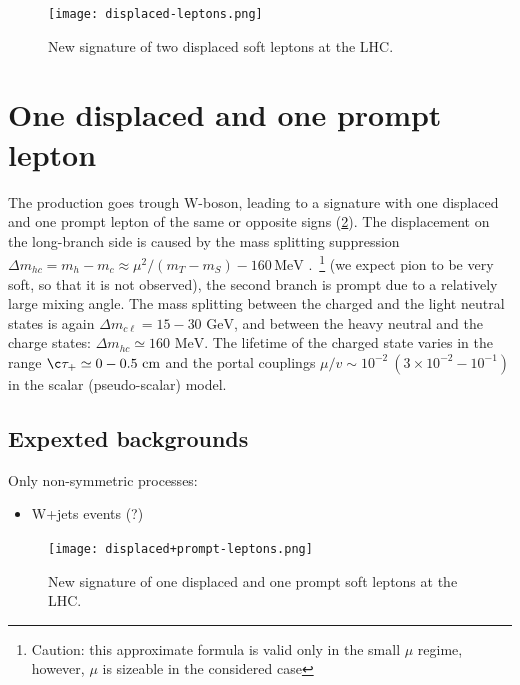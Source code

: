 \documentclass[12pt,letterpaper,notitlepage]{article}
\begin{document}
\begin{figure}[!h]
\centering
\texttt{[image: displaced-leptons.png]}
\caption{\label{fig:2displaced_diagram}New signature of two displaced soft leptons at the LHC.}
\end{figure}

\section{One displaced and one prompt lepton}

The production goes trough W-boson, leading to a signature with one displaced and one prompt lepton of the same or opposite signs (\ref{fig:2displaced_diagram}). The displacement on the long-branch side is caused by the mass splitting suppression $\Delta m_{hc} = m_h - m_c \approx \mu^2/(m_T - m_S) - 160\,\text{MeV}$ .~\footnote{Caution: this approximate formula is valid only in the small $\mu$ regime, however, $\mu$ is sizeable in the considered case} (we expect pion to be very soft, so that it is not observed), the second branch is prompt due to a relatively large mixing angle. The mass splitting between the charged and the light neutral states is again $\Delta m_{c \ell} = 15-30 \text{ GeV}$, and between the heavy neutral and the charge states: $\Delta m_{h c} \simeq 160 \text{ MeV}$. The lifetime of the charged state varies in the range $\c \tau_+ \simeq 0-0.5 \text{ cm}$ and the portal couplings $\mu/v \sim 10^{-2}\ (3\times 10^{-2}-10^{-1})$ in the scalar (pseudo-scalar) model.

\subsection{Expexted backgrounds}
Only non-symmetric processes:
\begin{itemize}
  \item W+jets events (?)
\end{itemize}

\begin{figure}[!h]
\centering
\texttt{[image: displaced+prompt-leptons.png]}
\caption{\label{fig:2displaced_diagram}New signature of one displaced and one prompt soft leptons at the LHC.}
\end{figure}
\end{document}
